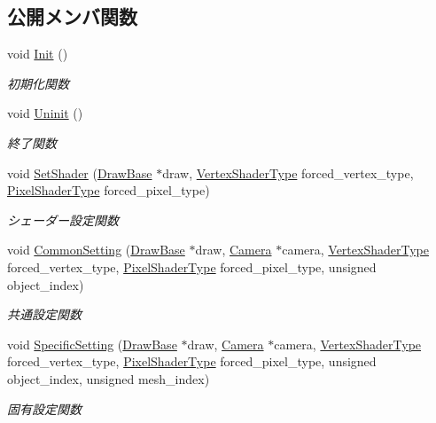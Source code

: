 \subsection*{公開メンバ関数}
\begin{DoxyCompactItemize}
\item 
void \mbox{\hyperlink{class_shader_manager_a8e8fd62a28cc18addcd5ec6507a5dcb0}{Init}} ()
\begin{DoxyCompactList}\small\item\em 初期化関数 \end{DoxyCompactList}\item 
void \mbox{\hyperlink{class_shader_manager_afc31a6bbe86e6b57edd7be0972f48ab1}{Uninit}} ()
\begin{DoxyCompactList}\small\item\em 終了関数 \end{DoxyCompactList}\item 
void \mbox{\hyperlink{class_shader_manager_ad2caed4ae50c1ca784151d0f9e50c381}{Set\+Shader}} (\mbox{\hyperlink{class_draw_base}{Draw\+Base}} $\ast$draw, \mbox{\hyperlink{class_shader_manager_a9b51e49d70eb3cc58f6d1f3994e8cfbd}{Vertex\+Shader\+Type}} forced\+\_\+vertex\+\_\+type, \mbox{\hyperlink{class_shader_manager_a7d15d773b3c6a99dd7086c45c8b0be5f}{Pixel\+Shader\+Type}} forced\+\_\+pixel\+\_\+type)
\begin{DoxyCompactList}\small\item\em シェーダー設定関数 \end{DoxyCompactList}\item 
void \mbox{\hyperlink{class_shader_manager_a6cfff8f4aee59d9bc5162a5a6f4d07d4}{Common\+Setting}} (\mbox{\hyperlink{class_draw_base}{Draw\+Base}} $\ast$draw, \mbox{\hyperlink{class_camera}{Camera}} $\ast$camera, \mbox{\hyperlink{class_shader_manager_a9b51e49d70eb3cc58f6d1f3994e8cfbd}{Vertex\+Shader\+Type}} forced\+\_\+vertex\+\_\+type, \mbox{\hyperlink{class_shader_manager_a7d15d773b3c6a99dd7086c45c8b0be5f}{Pixel\+Shader\+Type}} forced\+\_\+pixel\+\_\+type, unsigned object\+\_\+index)
\begin{DoxyCompactList}\small\item\em 共通設定関数 \end{DoxyCompactList}\item 
void \mbox{\hyperlink{class_shader_manager_af016392b9b0477d49165d753e9404ff4}{Specific\+Setting}} (\mbox{\hyperlink{class_draw_base}{Draw\+Base}} $\ast$draw, \mbox{\hyperlink{class_camera}{Camera}} $\ast$camera, \mbox{\hyperlink{class_shader_manager_a9b51e49d70eb3cc58f6d1f3994e8cfbd}{Vertex\+Shader\+Type}} forced\+\_\+vertex\+\_\+type, \mbox{\hyperlink{class_shader_manager_a7d15d773b3c6a99dd7086c45c8b0be5f}{Pixel\+Shader\+Type}} forced\+\_\+pixel\+\_\+type, unsigned object\+\_\+index, unsigned mesh\+\_\+index)
\begin{DoxyCompactList}\small\item\em 固有設定関数 \end{DoxyCompactList}\end{DoxyCompactItemize}
